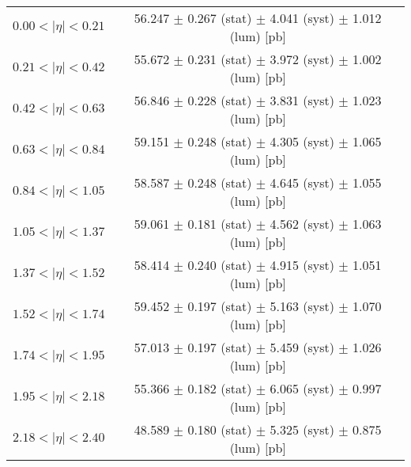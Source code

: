 \begin{tabular}{lc}
\hline
$0.00 < |\eta| <0.21$          & 56.247 $\pm$ 0.267 (stat) $\pm$ 4.041 (syst) $\pm$ 1.012 (lum) [pb]  \\
$0.21 < |\eta| <0.42$          & 55.672 $\pm$ 0.231 (stat) $\pm$ 3.972 (syst) $\pm$ 1.002 (lum) [pb]  \\
$0.42 < |\eta| <0.63$          & 56.846 $\pm$ 0.228 (stat) $\pm$ 3.831 (syst) $\pm$ 1.023 (lum) [pb]  \\
$0.63 < |\eta| <0.84$          & 59.151 $\pm$ 0.248 (stat) $\pm$ 4.305 (syst) $\pm$ 1.065 (lum) [pb]  \\
$0.84 < |\eta| <1.05$          & 58.587 $\pm$ 0.248 (stat) $\pm$ 4.645 (syst) $\pm$ 1.055 (lum) [pb]  \\
$1.05 < |\eta| <1.37$          & 59.061 $\pm$ 0.181 (stat) $\pm$ 4.562 (syst) $\pm$ 1.063 (lum) [pb]  \\
$1.37 < |\eta| <1.52$          & 58.414 $\pm$ 0.240 (stat) $\pm$ 4.915 (syst) $\pm$ 1.051 (lum) [pb]  \\
$1.52 < |\eta| <1.74$          & 59.452 $\pm$ 0.197 (stat) $\pm$ 5.163 (syst) $\pm$ 1.070 (lum) [pb]  \\
$1.74 < |\eta| <1.95$          & 57.013 $\pm$ 0.197 (stat) $\pm$ 5.459 (syst) $\pm$ 1.026 (lum) [pb]  \\
$1.95 < |\eta| <2.18$          & 55.366 $\pm$ 0.182 (stat) $\pm$ 6.065 (syst) $\pm$ 0.997 (lum) [pb]  \\
$2.18 < |\eta| <2.40$          & 48.589 $\pm$ 0.180 (stat) $\pm$ 5.325 (syst) $\pm$ 0.875 (lum) [pb]  \\
\hline
\end{tabular}

